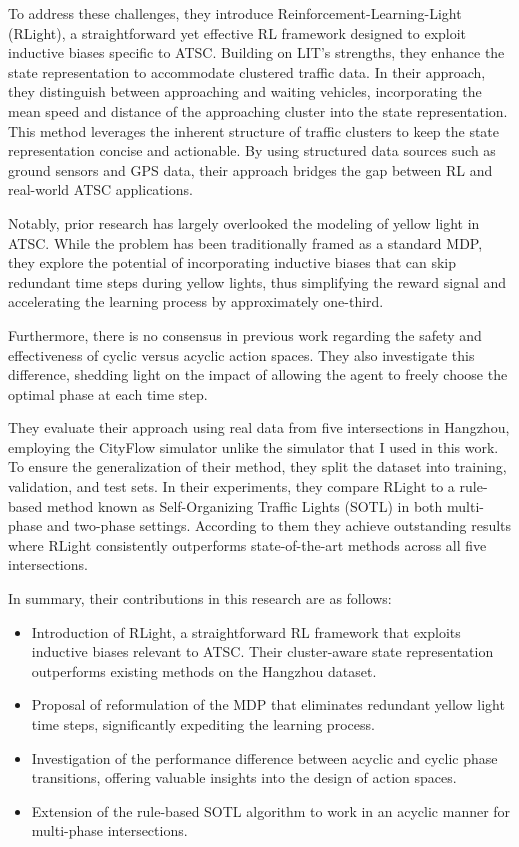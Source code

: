 To address these challenges, they introduce Reinforcement-Learning-Light (RLight)\cite{kanis2021deep}, a straightforward yet effective RL framework designed to exploit inductive biases specific to ATSC. Building on LIT's strengths, they enhance the state representation to accommodate clustered traffic data. In their approach, they distinguish between approaching and waiting vehicles, incorporating the mean speed and distance of the approaching cluster into the state representation. This method leverages the inherent structure of traffic clusters to keep the state representation concise and actionable. By using structured data sources such as ground sensors and GPS data, their approach bridges the gap between RL and real-world ATSC applications.

Notably, prior research has largely overlooked the modeling of yellow light in ATSC. While the problem has been traditionally framed as a standard MDP, they explore the potential of incorporating inductive biases that can skip redundant time steps during yellow lights, thus simplifying the reward signal and accelerating the learning process by approximately one-third.

Furthermore, there is no consensus in previous work regarding the safety and effectiveness of cyclic versus acyclic action spaces. They also investigate this difference, shedding light on the impact of allowing the agent to freely choose the optimal phase at each time step.

They evaluate their approach using real data from five intersections in Hangzhou, employing the CityFlow simulator \cite{zhang2019cityflow} unlike the simulator that I used in this work. To ensure the generalization of their method, they split the dataset into training, validation, and test sets. In their experiments, they compare RLight to a rule-based method known as Self-Organizing Traffic Lights (SOTL) \cite{cools2008selforganizing} in both multi-phase and two-phase settings. According to them they achieve outstanding results where RLight consistently outperforms state-of-the-art methods across all five intersections.

In summary, their contributions in this research are as follows:
\begin{itemize}
    \item Introduction of RLight, a straightforward RL framework that exploits inductive biases relevant to ATSC. Their cluster-aware state representation outperforms existing methods on the Hangzhou dataset.
    \item Proposal of reformulation of the MDP that eliminates redundant yellow light time steps, significantly expediting the learning process.
    \item Investigation of the performance difference between acyclic and cyclic phase transitions, offering valuable insights into the design of action spaces.
    \item Extension of the rule-based SOTL algorithm to work in an acyclic manner for multi-phase intersections.
\end{itemize}

